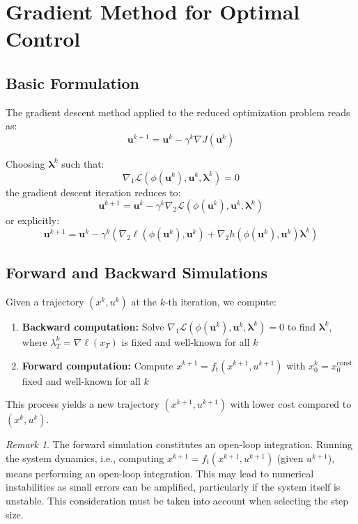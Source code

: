 \documentclass[openany]{book}
\theoremstyle{definition}
\theoremstyle{remark}
\newtheorem*{remark}{Remark}
\begin{document}
\section{Gradient Method for Optimal Control}

\subsection{Basic Formulation}
The gradient descent method applied to the reduced optimization problem reads as:
\[
    \mathbf{u}^{k+1} = \mathbf{u}^k - \gamma^k\nabla J(\mathbf{u}^k)
\]

Choosing $\boldsymbol{\lambda}^k$ such that:
\[
    \nabla_1\mathcal{L}(\phi(\mathbf{u}^k), \mathbf{u}^k, \boldsymbol{\lambda}^k) = 0
\]
the gradient descent iteration reduces to:
\[
    \mathbf{u}^{k+1} = \mathbf{u}^k - \gamma^k\nabla_2\mathcal{L}(\phi(\mathbf{u}^k), \mathbf{u}^k, \boldsymbol{\lambda}^k)
\]
or explicitly:
\[
    \mathbf{u}^{k+1} = \mathbf{u}^k - \gamma^k(\nabla_2\ell(\phi(\mathbf{u}^k), \mathbf{u}^k) + \nabla_2h(\phi(\mathbf{u}^k), \mathbf{u}^k)\boldsymbol{\lambda}^k)
\]

\subsection{Forward and Backward Simulations}
Given a trajectory $(x^k, u^k)$ at the $k$-th iteration, we compute:
\begin{enumerate}
    \item \textbf{Backward computation:} Solve $\nabla_1\mathcal{L}(\phi(\mathbf{u}^k), \mathbf{u}^k, \boldsymbol{\lambda}^k)=0$ to find $\boldsymbol{\lambda}^k$, where $\lambda_T^k = \nabla\ell(x_T)$ is fixed and well-known for all $k$
    \item \textbf{Forward computation:} Compute $x^{k+1} = f_t(x^{k+1}, u^{k+1})$ with $x_0^k = x_0^{\text{const}}$ fixed and well-known for all $k$
\end{enumerate}

This process yields a new trajectory $(x^{k+1}, u^{k+1})$ with lower cost compared to $(x^k, u^k)$.

\begin{remark}
The forward simulation constitutes an open-loop integration. Running the system dynamics, i.e., computing $x^{k+1}=f_t(x^{k+1}, u^{k+1})$ (given $u^{k+1}$), means performing an open-loop integration. This may lead to numerical instabilities as small errors can be amplified, particularly if the system itself is unstable. This consideration must be taken into account when selecting the step size.
\end{remark}
\end{document}
